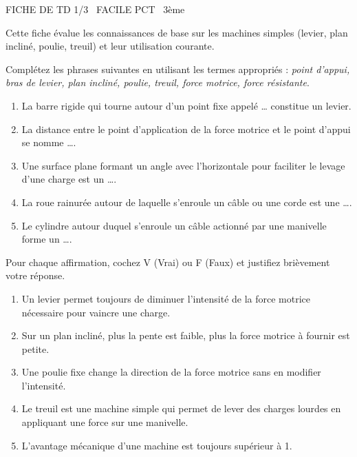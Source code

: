 \documentclass[11pt]{article}
\begin{document}
\begin{tcolorbox}[enhanced,colback=popink,colframe=popink,arc=10pt,boxrule=0pt,left=12pt,right=12pt,top=9pt,bottom=9pt]
{\color{white}\popxbold\small FICHE DE TD 1/3 \textbullet\ FACILE \hfill PCT \textbullet\ 3ème\par}
\end{tcolorbox}
\vspace{4pt}
Cette fiche évalue les connaissances de base sur les machines simples (levier, plan incliné, poulie, treuil) et leur utilisation courante.

\begin{exercice}
Complétez les phrases suivantes en utilisant les termes appropriés : \textit{point d'appui, bras de levier, plan incliné, poulie, treuil, force motrice, force résistante}.
\begin{enumerate}
    \item La barre rigide qui tourne autour d'un point fixe appelé \ldots{} constitue un levier.
    \item La distance entre le point d'application de la force motrice et le point d'appui se nomme \ldots{}.
    \item Une surface plane formant un angle avec l'horizontale pour faciliter le levage d'une charge est un \ldots{}.
    \item La roue rainurée autour de laquelle s'enroule un câble ou une corde est une \ldots{}.
    \item Le cylindre autour duquel s'enroule un câble actionné par une manivelle forme un \ldots{}.
\end{enumerate}
\end{exercice}

\begin{exercice}
Pour chaque affirmation, cochez V (Vrai) ou F (Faux) et justifiez brièvement votre réponse.
\begin{enumerate}
    \item Un levier permet toujours de diminuer l'intensité de la force motrice nécessaire pour vaincre une charge.
    \item Sur un plan incliné, plus la pente est faible, plus la force motrice à fournir est petite.
    \item Une poulie fixe change la direction de la force motrice sans en modifier l'intensité.
    \item Le treuil est une machine simple qui permet de lever des charges lourdes en appliquant une force sur une manivelle.
    \item L'avantage mécanique d'une machine est toujours supérieur à 1.
\end{enumerate}
\end{exercice}
\end{document}
